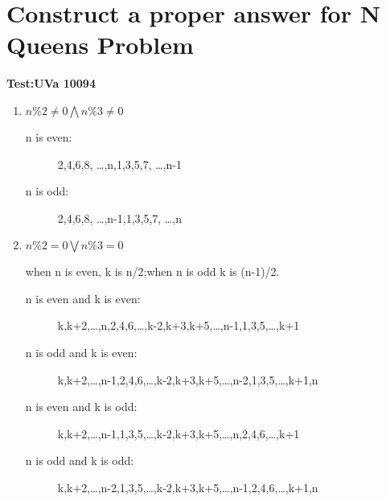  \section{Construct a proper answer for N Queens Problem}
 \textbf{Test:UVa 10094}
 \begin{enumerate}
  \item $n\%2 \ne 0 \bigwedge n\%3 \ne 0$
  \begin{description}
   \item[n is even:] 2,4,6,8, \dots ,n,1,3,5,7, \dots ,n-1
   \item[n is odd:]  2,4,6,8, \dots ,n-1,1,3,5,7, \dots ,n
  \end{description}
  \item $n\%2=0 \bigvee n\%3=0$

when n is even, k is n/2;when n is odd k is (n-1)/2.
  \begin{description}
   \item[n is even and k is even:]
k,k+2,\dots,n,2,4,6,\dots,k-2,k+3,k+5,\dots,n-1,1,3,5,\dots,k+1
   \item[n is odd and k is even:]
k,k+2,\dots,n-1,2,4,6,\dots,k-2,k+3,k+5,\dots,n-2,1,3,5,\dots,k+1,n
   \item[n is even and k is odd:]
k,k+2,\dots,n-1,1,3,5,\dots,k-2,k+3,k+5,\dots,n,2,4,6,\dots,k+1
   \item[n is odd and k is odd:]
k,k+2,\dots,n-2,1,3,5,\dots,k-2,k+3,k+5,\dots,n-1,2,4,6,\dots,k+1,n
  \end{description}
 \end{enumerate}











\endinput